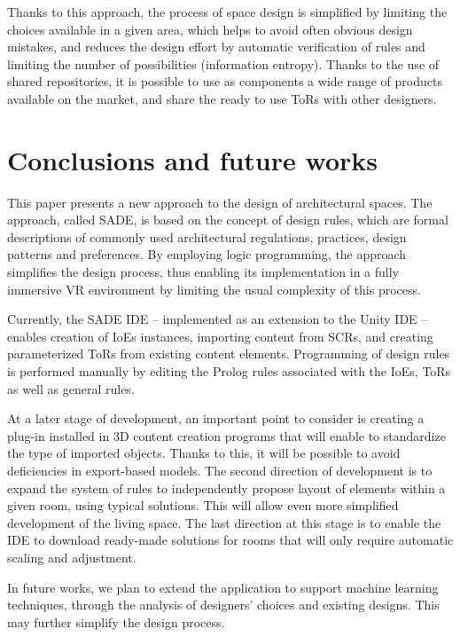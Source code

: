 \documentclass[runningheads]{llncs}
\begin{document}
Thanks to this approach, the process of space design is simplified by limiting the choices available in a given area, which helps to avoid often obvious design mistakes, and reduces the design effort by automatic verification of rules and limiting the number of possibilities (information entropy). Thanks to the use of shared repositories, it is possible to use as components a wide range of products available on the market, and share the ready to use ToRs with other designers.


\section{Conclusions and future works}
This paper presents a new approach to the design of architectural spaces. The approach, called SADE, is based on the concept of design rules, which are formal descriptions of commonly used architectural regulations, practices, design patterns and preferences. By employing logic programming, the approach simplifies the design process, thus enabling its implementation in a fully immersive VR environment by limiting the usual complexity of this process.

Currently, the SADE IDE -- implemented as an extension to the Unity IDE -- enables creation of IoEs instances, importing content from SCRs, and creating parameterized ToRs from existing content elements. Programming of design rules is performed manually by editing the Prolog rules associated with the IoEs, ToRs as well as general rules. 

At a later stage of development, an important point to consider is creating a plug-in installed in 3D content creation programs that will enable to standardize the type of imported objects. Thanks to this, it will be possible to avoid deficiencies in export-based models. The second direction of development is to expand the system of rules to independently propose layout of elements within a given room, using typical solutions. This will allow even more simplified development of the living space. The last direction at this stage is to enable the IDE to download ready-made solutions for rooms that will only require automatic scaling and adjustment.

In future works, we plan to extend the application to support machine learning techniques, through the analysis of designers' choices and existing designs. This may further simplify the design process. 
\end{document}
